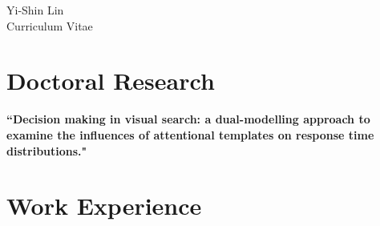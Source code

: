 \documentclass[10pt]{article} %
\begin{document}
\begin{paracol}{2} %


\parbox[top][0.12\textheight][c]{\linewidth}{ %
	\vspace{-0.04\textheight} %
	\centering %
	{\sffamily\Huge Yi-Shin Lin}\\\medskip %
	{\Huge\color{headings}\cvtextfont Curriculum Vitae}
}


\section{Doctoral Research}

{\raggedright\textbf{``Decision making in visual search: a dual-modelling 
approach to examine the influences of attentional templates on response time distributions."}\\\medskip}

\medskip %


\section{Work Experience}






\end{paracol}
\end{document}
